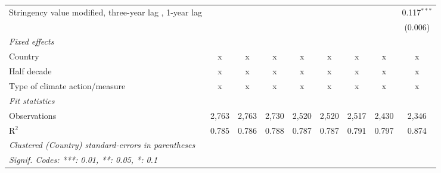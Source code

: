 \begin{table}[htbp]
\begin{tabular}{lcccccccc}
      Stringency value modified, three-year lag , 1-year lag                  &              &               &                &                &                &                &                & 0.117$^{***}$\\   
                                                                              &              &               &                &                &                &                &                & (0.006)\\   
      \emph{Fixed effects}\\
      Country                                                                 & x            & x             & x              & x              & x              & x              & x              & x\\  
      Half decade                                                             & x            & x             & x              & x              & x              & x              & x              & x\\  
      Type of climate action/measure                                          & x            & x             & x              & x              & x              & x              & x              & x\\  
      \midrule \emph{Fit statistics}\\
      Observations                                                            & 2,763        & 2,763         & 2,730          & 2,520          & 2,520          & 2,517          & 2,430          & 2,346\\  
      R$^2$                                                                   & 0.785        & 0.786         & 0.788          & 0.787          & 0.787          & 0.791          & 0.797          & 0.874\\  
      \midrule
      \multicolumn{9}{l}{\emph{Clustered (Country) standard-errors in parentheses}}\\
      \multicolumn{9}{l}{\emph{Signif. Codes: ***: 0.01, **: 0.05, *: 0.1}}\\
   \end{tabular}
\end{table}


